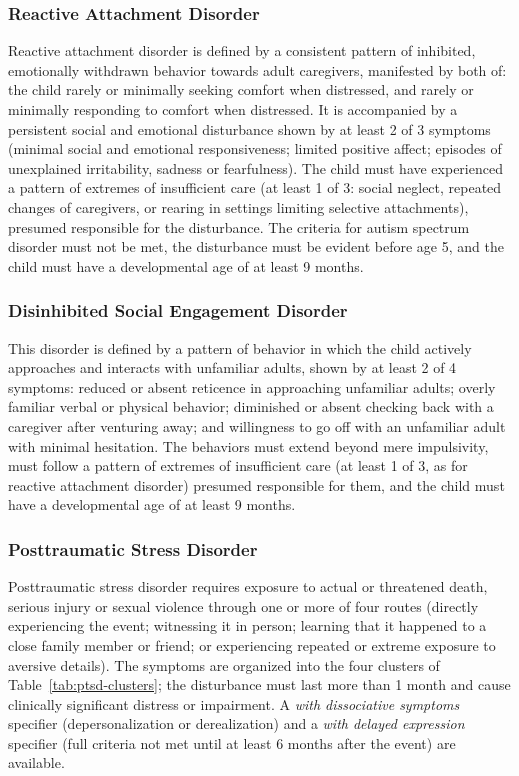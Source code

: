 \subsubsection{Reactive Attachment Disorder}

Reactive attachment disorder is defined by a consistent pattern of inhibited,
emotionally withdrawn behavior towards adult caregivers, manifested by
both of: the child rarely or minimally seeking comfort when distressed,
and rarely or minimally responding to comfort when distressed. It is accompanied
by a persistent social and emotional disturbance shown by at least 2 of
3 symptoms (minimal social and emotional responsiveness; limited positive
affect; episodes of unexplained irritability, sadness or fearfulness). The child
must have experienced a pattern of extremes of insufficient care
(at least 1 of 3: social neglect, repeated changes of caregivers, or
rearing in settings limiting selective attachments), presumed responsible for the
disturbance. The criteria for autism spectrum disorder must not be met, the
disturbance must be evident before age 5, and the child must have a
developmental age of at least 9 months.

\subsubsection{Disinhibited Social Engagement Disorder}

This disorder is defined by a pattern of behavior in which the child actively
approaches and interacts with unfamiliar adults, shown by at least 2 of
4 symptoms: reduced or absent reticence in approaching unfamiliar adults; overly
familiar verbal or physical behavior; diminished or absent checking back with a
caregiver after venturing away; and willingness to go off with an unfamiliar
adult with minimal hesitation. The behaviors must extend beyond mere
impulsivity, must follow a pattern of extremes of insufficient care
(at least 1 of 3, as for reactive attachment disorder) presumed
responsible for them, and the child must have a developmental age of
at least 9 months.

\subsubsection{Posttraumatic Stress Disorder}

Posttraumatic stress disorder requires exposure to actual or threatened death,
serious injury or sexual violence through one or more of four routes (directly
experiencing the event; witnessing it in person; learning that it happened to a
close family member or friend; or experiencing repeated or extreme exposure to
aversive details). The symptoms are organized into the four clusters of
Table~\ref{tab:ptsd-clusters}; the disturbance must last more than 1
month and cause clinically significant distress or impairment. A \emph{with
dissociative symptoms} specifier (depersonalization or derealization) and a
\emph{with delayed expression} specifier (full criteria not met until at least 6
months after the event) are available.

